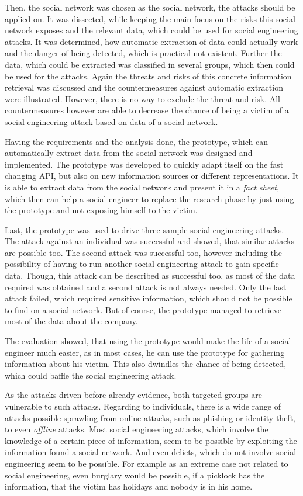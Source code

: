 Then, the \Twitter{} social network was chosen as the social network, the
attacks should be applied on. It was dissected, while keeping the main focus on the
risks this social network exposes and the relevant data, which could be used
for social engineering attacks. It was determined, how automatic extraction of
data could actually work and the danger of being detected, which is practical
not existent. Further the data, which could be extracted was classified in
several groups, which then could be used for the attacks. Again the threats and
risks of this concrete information retrieval was discussed and the
countermeasures against automatic extraction were illustrated. However, there
is no way to exclude the threat and risk. All countermeasures however are able
to decrease the chance of being a victim of a social engineering attack based
on data of a social network.

Having the requirements and the analysis done, the prototype, which can
automatically extract data from the \Twitter{} social network was designed and
implemented. The prototype was developed to quickly adapt itself on the fast
changing \Twitter{} API, but also on new information sources or different
representations. It is able to extract data from the social network and present
it in a \textit{fact sheet}, which then can help a social engineer to replace
the research phase by just using the prototype and not exposing himself to the
victim.

Last, the prototype was used to drive three sample social engineering attacks.
The attack against an individual was successful and showed, that similar
attacks are possible too. The second attack was successful too, however
including the possibility of having to run another social engineering attack to
gain specific data. Though, this attack can be described as successful too, as
most of the data required was obtained and a second attack is not always
needed. Only the last attack failed, which required sensitive information,
which should not be possible to find on a social network. But of course, the
prototype managed to retrieve most of the data about the company.

The evaluation showed, that using the prototype would make the life of a social
engineer much easier, as in most cases, he can use the prototype for gathering
information about his victim. This also dwindles the chance of being detected,
which could baffle the social engineering attack.

As the attacks driven before already evidence, both targeted groups are
vulnerable to such attacks. Regarding to individuals, there is a wide range
of attacks possible sprawling from online attacks, such as phishing or identity
theft, to even \textit{offline} attacks. Most social engineering attacks, which
involve the knowledge of a certain piece of information, seem to be possible by
exploiting the information found a social network. And even delicts, which do
not involve social engineering seem to be possible. For example as an extreme
case not related to social engineering, even burglary would be possible, if a
picklock has the information, that the victim has holidays and nobody is in his
home.

